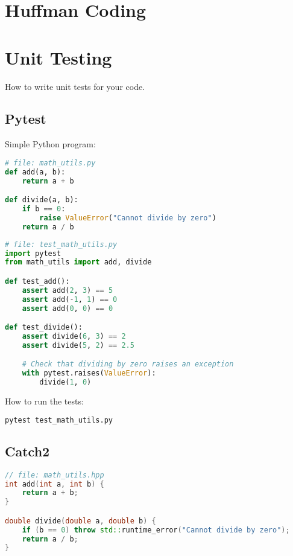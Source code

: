\documentclass[12pt]{article}
\begin{document}
\section{Huffman Coding}



\section{Unit Testing}

How to write unit tests for your code.

\subsection{Pytest}

Simple Python program:

\begin{lstlisting}[language=Python]
# file: math_utils.py
def add(a, b):
    return a + b

def divide(a, b):
    if b == 0:
        raise ValueError("Cannot divide by zero")
    return a / b
\end{lstlisting}

\begin{lstlisting}[language=Python]
# file: test_math_utils.py
import pytest
from math_utils import add, divide

def test_add():
    assert add(2, 3) == 5
    assert add(-1, 1) == 0
    assert add(0, 0) == 0

def test_divide():
    assert divide(6, 3) == 2
    assert divide(5, 2) == 2.5

    # Check that dividing by zero raises an exception
    with pytest.raises(ValueError):
        divide(1, 0)

\end{lstlisting}

How to run the tests:

\begin{lstlisting}[language=bash]
pytest test_math_utils.py
\end{lstlisting}


\subsection{Catch2}

\begin{lstlisting}[language=C++]
// file: math_utils.hpp
int add(int a, int b) {
    return a + b;
}

double divide(double a, double b) {
    if (b == 0) throw std::runtime_error("Cannot divide by zero");
    return a / b;
}

\end{lstlisting}
\end{document}

